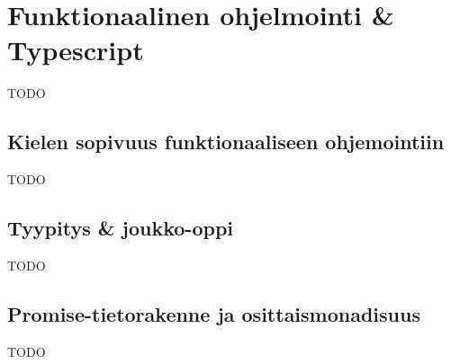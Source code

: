 \section{Funktionaalinen ohjelmointi \& Typescript}

TODO



\subsection{Kielen sopivuus funktionaaliseen ohjemointiin}

TODO


\subsection{Tyypitys \& joukko-oppi}

TODO





\subsection{Promise-tietorakenne ja osittaismonadisuus}

TODO

